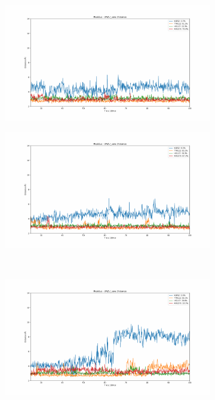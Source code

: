 \begin{figure}[!ht]
\centering
  \begin{subfigure}{.45\textwidth}
     \centering
     \includegraphics[width=.95\linewidth]{chapter4/2AZU_canc/2AZU_canc-dist_0.pdf}
  \end{subfigure}
  \begin{subfigure}{.45\textwidth}
     \centering
     \includegraphics[width=.95\linewidth]{chapter4/2AZU_canc/2AZU_canc-dist_1.pdf}
  \end{subfigure}
  \\
  \begin{subfigure}{.45\textwidth}
     \centering
     \includegraphics[width=.95\linewidth]{chapter4/2AZU_canc/2AZU_canc-dist_2.pdf}

\end{subfigure}
\end{figure}
